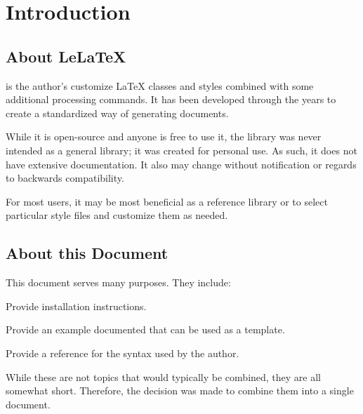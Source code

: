 \chapter{Introduction}

\section{About LeLaTeX}
\lelatex{} is the author's customize \LaTeX{} classes and styles combined with some additional processing commands.  It has been developed through the years to create a standardized way of generating documents.

While it is open-source and anyone is free to use it, the library was never intended as a general library; it was created for personal use.  As such, it does not have extensive documentation.  It also may change without notification or regards to backwards compatibility.

For most users, it may be most beneficial as a reference library or to select particular style files and customize them as needed. 

\section{About this Document}
This document serves many purposes.  They include:
\begin{bulletedlist}
	\item Provide installation instructions.
	\item Provide an example documented that can be used as a template.
	\item Provide a reference for the syntax used by the author.
\end{bulletedlist}

While these are not topics that would typically be combined, they are all somewhat short.  Therefore, the decision was made to combine them into a single document.